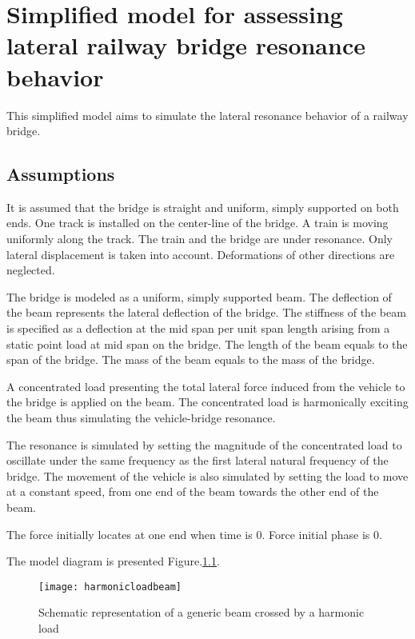 
\chapter{Simplified model for assessing lateral railway bridge resonance behavior}
This simplified model aims to simulate the lateral resonance behavior of a railway bridge. 

\section{Assumptions}

It is assumed that the bridge is straight and uniform, simply supported on both ends. One track is installed on the center-line of the bridge. A train is moving uniformly along the track. The train and the bridge are under resonance. Only lateral displacement is taken into account. Deformations of other directions are neglected.

The bridge is modeled as a uniform, simply supported beam. The deflection of the beam represents the lateral deflection of the bridge. The stiffness of the beam is specified as a deflection at the mid span per unit span length arising from a static point load at mid span on the bridge. The length of the beam equals to the span of the bridge. The mass of the beam equals to the mass of the bridge.

A concentrated load presenting the total lateral force induced from the vehicle to the bridge is applied on the beam. The concentrated load is harmonically exciting the beam thus simulating the vehicle-bridge resonance.

The resonance is simulated by setting the magnitude of the concentrated load to oscillate under the same frequency as the first lateral natural frequency of the bridge. The movement of the vehicle is also simulated by setting the load to move at a constant speed, from one end of the beam towards the other end of the beam. 

The force initially locates at one end when time is $0$. Force initial phase is $0$. 

The model diagram is presented Figure.\ref{fig:harmonicloadbeam}.
\begin{figure}[h]
    \centering
    \texttt{[image: harmonicloadbeam]}
    \caption{Schematic representation of a generic beam crossed by a harmonic load}
    \label{fig:harmonicloadbeam}
\end{figure}

